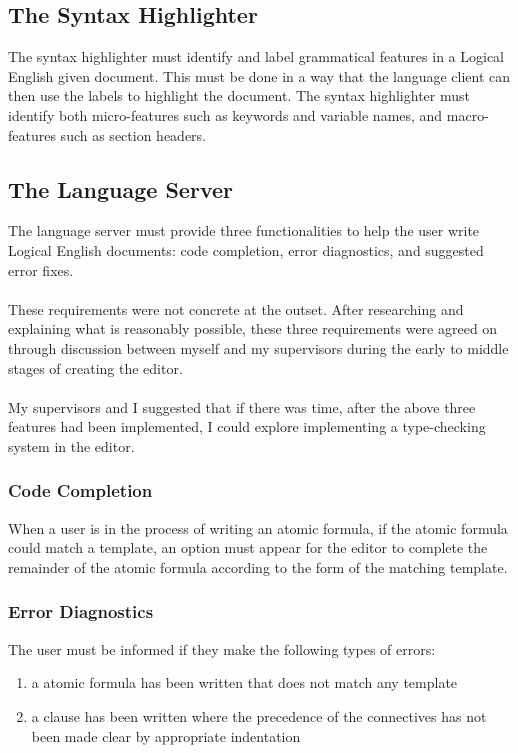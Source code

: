 \documentclass[../main.tex]{subfiles}
\begin{document}
\subsection{The Syntax Highlighter}
The syntax highlighter must identify and label grammatical features in a Logical English given document. This must be done in a way that the language client can then use the labels to highlight the document. The syntax highlighter must identify both micro-features such as keywords and variable names, and macro-features such as section headers.

\subsection{The Language Server}
The language server must provide three functionalities to help the user write Logical English documents: code completion, error diagnostics, and suggested error fixes. 
\\ 
\\
These requirements were not concrete at the outset. After researching and explaining what is reasonably possible, these three requirements were agreed on through discussion between myself and my supervisors during the early to middle stages of creating the editor. 
\\
\\
My supervisors and I suggested that if there was time, after the above three features had been implemented, I could explore implementing a type-checking system in the editor.

\subsubsection{Code Completion}
When a user is in the process of writing an atomic formula, if the atomic formula could match a template, an option must appear for the editor to complete the remainder of the atomic formula according to the form of the matching template.

\subsubsection{Error Diagnostics}
The user must be informed if they make the following types of errors:
\begin{enumerate}
    \item a atomic formula has been written that does not match any template 
    \item a clause has been written where the precedence of the connectives has not been made clear by appropriate indentation
\end{enumerate}
\end{document}
